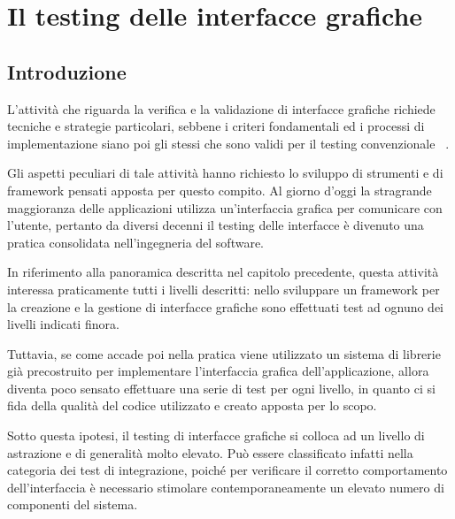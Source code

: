 

\section{Il testing delle interfacce grafiche}

\subsection{Introduzione}

L'attività che riguarda la verifica e la validazione di interfacce grafiche richiede tecniche e strategie particolari, sebbene i criteri fondamentali ed i processi di implementazione siano poi gli stessi che sono validi per il testing convenzionale ~\cite{memonGuiTesting}.

Gli aspetti peculiari di tale attività hanno richiesto lo sviluppo di strumenti e di framework pensati apposta per questo compito. Al giorno d'oggi la stragrande maggioranza delle applicazioni utilizza un'interfaccia grafica per comunicare con l'utente, pertanto da diversi decenni il testing delle interfacce è divenuto una pratica consolidata nell'ingegneria del software.

In riferimento alla panoramica descritta nel capitolo precedente, questa attività interessa praticamente tutti i livelli descritti: nello sviluppare un framework per la creazione e la gestione di interfacce grafiche sono effettuati test ad ognuno dei livelli indicati finora.

Tuttavia, se come accade poi nella pratica viene utilizzato un sistema di librerie già precostruito per implementare l'interfaccia grafica dell'applicazione, allora diventa poco sensato effettuare una serie di test per ogni livello, in quanto ci si fida della qualità del codice utilizzato e creato apposta per lo scopo.

Sotto questa ipotesi, il testing di interfacce grafiche si colloca ad un livello di astrazione e di generalità molto elevato. Può essere classificato infatti nella categoria dei test di integrazione, poiché per verificare il corretto comportamento dell'interfaccia è necessario stimolare contemporaneamente un elevato numero di componenti del sistema. 


